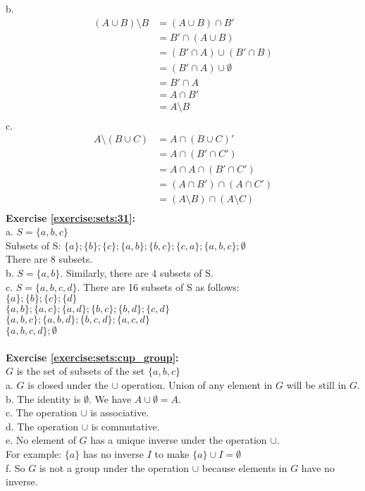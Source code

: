 b.\begin{align*}
(A\cup B) \setminus B & =(A\cup B)\cap B'\\
& = B'\cap (A\cup B)\\
& = (B'\cap A)\cup(B'\cap B)\\
& = (B'\cap A)\cup \emptyset\\
& = B'\cap A\\
& = A\cap B'\\
& = A\setminus B\\
\end{align*}
c.\begin{align*}
A\setminus (B\cup C) & =A\cap (B\cup C)'\\
& = A\cap (B'\cap C')\\
& = A\cap A\cap(B'\cap C')\\
& = (A\cap B')\cap (A\cap C')\\
& = (A\setminus B)\cap (A\setminus C)\\
\end{align*}
\textbf{Exercise \ref{exercise:sets:31}:}\\
a. $S=\{a,b,c\}$\\
Subsets of S: $\{a\};\{b\};\{c\};\{a,b\};\{b,c\};\{c,a\};\{a,b,c\};\emptyset$\\
There are 8 subsets.\\
b. $S=\{a,b\}$. Similarly, there are 4 subsets of S.\\
c. $S=\{a,b,c,d\}$. There are 16 subsets of S as follows:\\
$\{a\};\{b\};\{c\};\{d\}$\\
$\{a,b\};\{a,c\};\{a,d\};\{b,c\};\{b,d\};\{c,d\}$\\
$\{a,b,c\};\{a,b,d\};\{b,c,d\};\{a,c,d\}$\\
$\{a,b,c,d\};\emptyset$\\
\\
\textbf{Exercise \ref{exercise:sets:cup_group}:}\\
$G$ is the set of subsets of the set $\{a,b,c\}$\\
a. $G$ is closed under the $\cup$ operation. Union of any element in $G$ will be still in $G$.\\
b. The identity is $\emptyset$. We have $A\cup \emptyset=A$.\\
c. The operation $\cup$ is associative.\\
d. The operation $\cup$ is commutative.\\
e. No element of $G$ has a unique inverse under the operation $\cup$.\\
For example: $\{a\}$ has no inverse $I$ to make $\{a\}\cup I=\emptyset$\\
f. So $G$ is not a group under the operation $\cup$ because elements in $G$ have no inverse.\\

